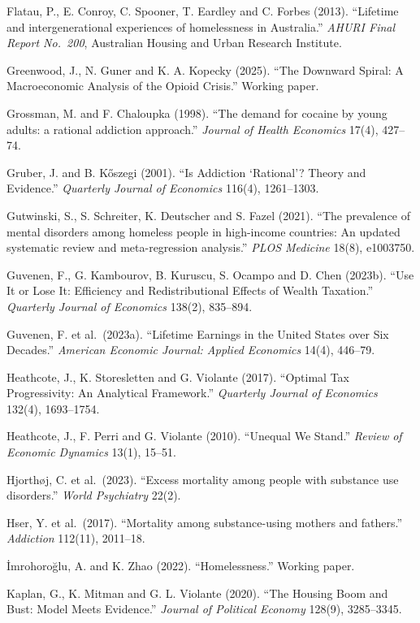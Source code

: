 \documentclass[10pt]{article}
\begin{document}
{\begin{list}{}{\setlength{\leftmargin}{1.5em}\setlength{\itemindent}{-1.5em}\setlength{\itemsep}{0.35em}\setlength{\parsep}{0em}}
\item Flatau, P., E. Conroy, C. Spooner, T. Eardley and C. Forbes (2013). ``Lifetime and intergenerational experiences of homelessness in Australia.'' \emph{AHURI Final Report No.\ 200}, Australian Housing and Urban Research Institute.
\item Greenwood, J., N. Guner and K. A. Kopecky (2025). ``The Downward Spiral: A Macroeconomic Analysis of the Opioid Crisis.'' Working paper.
\item Grossman, M. and F. Chaloupka (1998). ``The demand for cocaine by young adults: a rational addiction approach.'' \emph{Journal of Health Economics} 17(4), 427--74.
\item Gruber, J. and B. K\H{o}szegi (2001). ``Is Addiction `Rational'? Theory and Evidence.'' \emph{Quarterly Journal of Economics} 116(4), 1261--1303.
\item Gutwinski, S., S. Schreiter, K. Deutscher and S. Fazel (2021). ``The prevalence of mental disorders among homeless people in high-income countries: An updated systematic review and meta-regression analysis.'' \emph{PLOS Medicine} 18(8), e1003750.
\item Guvenen, F., G. Kambourov, B. Kuruscu, S. Ocampo and D. Chen (2023b). ``Use It or Lose It: Efficiency and Redistributional Effects of Wealth Taxation.'' \emph{Quarterly Journal of Economics} 138(2), 835--894.
\item Guvenen, F. et al.\ (2023a). ``Lifetime Earnings in the United States over Six Decades.'' \emph{American Economic Journal: Applied Economics} 14(4), 446--79.
\item Heathcote, J., K. Storesletten and G. Violante (2017). ``Optimal Tax Progressivity: An Analytical Framework.'' \emph{Quarterly Journal of Economics} 132(4), 1693--1754.
\item Heathcote, J., F. Perri and G. Violante (2010). ``Unequal We Stand.'' \emph{Review of Economic Dynamics} 13(1), 15--51.
\item Hjorth\o j, C. et al.\ (2023). ``Excess mortality among people with substance use disorders.'' \emph{World Psychiatry} 22(2).
\item Hser, Y. et al.\ (2017). ``Mortality among substance-using mothers and fathers.'' \emph{Addiction} 112(11), 2011--18.
\item \.{I}mrohoro\u{g}lu, A. and K. Zhao (2022). ``Homelessness.'' Working paper.
\item Kaplan, G., K. Mitman and G. L. Violante (2020). ``The Housing Boom and Bust: Model Meets Evidence.'' \emph{Journal of Political Economy} 128(9), 3285--3345.

\end{list}}
\end{document}

